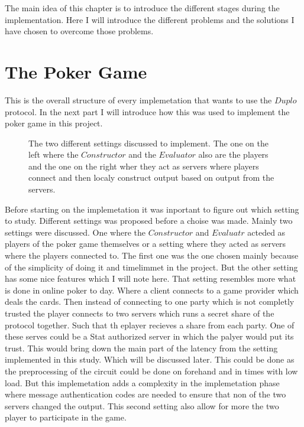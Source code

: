 The main idea of this chapter is to introduce the different stages during the implementation. Here I will introduce the different problems and the solutions I have chosen to overcome those problems.


\section{The Poker Game}
This is the overall structure of every implemetation that wants to use the $Duplo$ protocol. In the next part I will introduce how this was used to implement the poker game in this project.

\bigskip

\begin{figure}
\label{poker_setting}
\centering

\caption{The two different settings discussed to implement. The one on the left where the $Constructor$ and the $Evaluator$ also are the players and the one on the right wher they act as servers where players connect and then localy construct output based on output from the servers.}
\end{figure}


Before starting on the implemetation it was inportant to figure out which setting to study. Different settings was proposed before a choise was made. Mainly two settings were discussed. One where the $Constructor$ and $Evaluatr$ acteded as players of the poker game themselves or a setting where they acted as servers where the players connected to. The first one was the one chosen mainly because of the simplicity of doing it and timelimmet in the project. But the other setting has some nice features which I will note here. That setting resembles more what is done in online poker to day. Where a client connects to a game provider which deals the cards. Then instead of connecting to one party which is not completly trusted the player connects to two servers which runs a secret share of the protocol together. Such that th eplayer recieves a share from each party. One of these serves could be a Stat authorized server in which the palyer would put its trust. This would bring down the main part of the latency from the setting implemented in this study. Which will be discussed later. This could be done as the preprocessing of the circuit could be done on forehand and in times with low load. But this implemetation adds a complexity in the implemetation phase where message authentication codes are needed to ensure that non of the two servers changed the output. This second setting also allow for more the two player to participate in the game.

